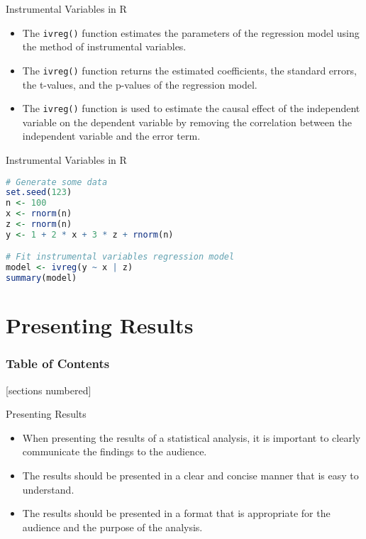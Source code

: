 \documentclass[serif, 9pt, aspectratio=32]{beamer}
\begin{document}
\begin{frame}{Instrumental Variables in R}
    \begin{itemize}
        \setlength{\itemsep}{2em}
        \item The \texttt{ivreg()} function estimates the parameters of the regression model using the method of instrumental variables.
        \item The \texttt{ivreg()} function returns the estimated coefficients, the standard errors, the t-values, and the p-values of the regression model.
        \item The \texttt{ivreg()} function is used to estimate the causal effect of the independent variable on the dependent variable by removing the correlation between the independent variable and the error term.
    \end{itemize}
\end{frame}

\begin{frame}[fragile]{Instrumental Variables in R}
    \begin{lstlisting}[language=R]
# Generate some data 
set.seed(123)
n <- 100
x <- rnorm(n)
z <- rnorm(n)
y <- 1 + 2 * x + 3 * z + rnorm(n)

# Fit instrumental variables regression model
model <- ivreg(y ~ x | z)
summary(model)
    \end{lstlisting}
\end{frame}

\section{Presenting Results}

\begin{frame}
    \frametitle{Table of Contents}
    [sections numbered]
    \tableofcontents[currentsection]
\end{frame}

\begin{frame}{Presenting Results}
    \begin{itemize}
        \setlength{\itemsep}{2em}
        \item When presenting the results of a statistical analysis, it is important to clearly communicate the findings to the audience.
        \item The results should be presented in a clear and concise manner that is easy to understand.
        \item The results should be presented in a format that is appropriate for the audience and the purpose of the analysis.
    \end{itemize}
\end{frame}
\end{document}
